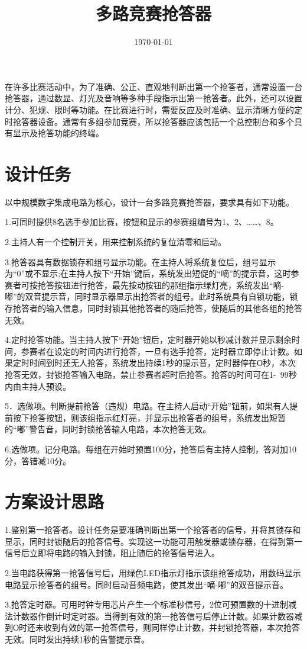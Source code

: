 \documentclass{../source/Experiment}
\title{多路竞赛抢答器}
\date{\today}
\begin{document}
    \makecover
    \makeheader
        在许多比赛活动中，为了准确、公正、直观地判断出第一个抢答者，通常设置一台抢答器，通过数显、灯光及音响等多种手段指示出第一抢答者。此外，还可以设置计分、犯规、限时等功能。在比赛进行时，需要反应及时准确、显示清晰方便的定时抢答器设备。通常有多组参加竞赛，所以抢答器应该包括一个总控制台和多个具有显示及抢答功能的终端。
    \section{设计任务}
        以中规模数字集成电路为核心，设计一台多路竞赛抢答器，要求具有如下功能。

        1.可同时提供8名选手参加比赛，按钮和显示的参赛组编号为1、2、……、8。

        2.主持人有一个控制开关，用来控制系统的复位清零和启动。

        3.抢答器具有数据锁存和组号显示功能。在主持人将系统复位后，组号显示为“0”或不显示;在主持人按下“开始”键后，系统发出短促的“嘀”的提示音，这时参赛者可按抢答按钮进行抢答，最先按动按钮的那组指示绿灯亮，系统发出“嘀-嘟”的双音提示音，同时显示器显示出抢答者的组号。此时系统具有自锁功能，锁存抢答者的输入信息，同时封锁其他抢答者的随后抢答，使随后的其他各组的抢答无效。

        4.定时抢答功能。当主持人按下“开始”钮后，定时器开始以秒减计数并显示剩余时间，参赛者在设定的时间内进行抢答，一旦有选手抢答，定时器立即停止计数。如果定时时间到时还无人抢答，系统发出持续1秒的提示音，定时器停在О秒，本次抢答无效，封锁抢答输入电路，禁止参赛者超时后抢答。抢答的时间可在1-~99秒内由主持人预设。

        5．选做项。判断提前抢答（违规）电路。在主持人启动“开始”钮前，如果有人提前按下抢答按钮，则该组指示红灯亮，并显示出抢答者的组号，系统发出短暂的“嘟”警告音，同时封锁抢答输入电路，本次抢答无效。

        6.选做项。记分电路。每组在开始时预置100分，抢答后有主持人控制，答对加10分，答错减10分。
    \section{方案设计思路}
        1.鉴别第一抢答者。设计任务是要准确判断出第一个抢答者的信号，并将其锁存和显示，同时封锁随后的抢答信号。实现这一功能可用触发器或锁存器，在得到第一信号后立即将电路的输入封锁，阻止随后的抢答信号进入。

        2.当电路获得第一抢答信号后，用绿色LED指示灯指示该组抢答成功，用数码显示电路显示抢答者的组号。同时启动音频电路，使其发出“嘀-嘟”的双音提示音。

        3.抢答定时器。可用时钟专用芯片产生一个标准秒信号，2位可预置数的十进制减法计数器作倒计时定时器。当得到有效的第一抢答信号后停止计数。如果计数器减到О时还未收到有效的第一抢答信号，则同样停止计数，并封锁抢答器，本次抢答无效。同时发出持续1秒的告警提示音。
\end{document}
